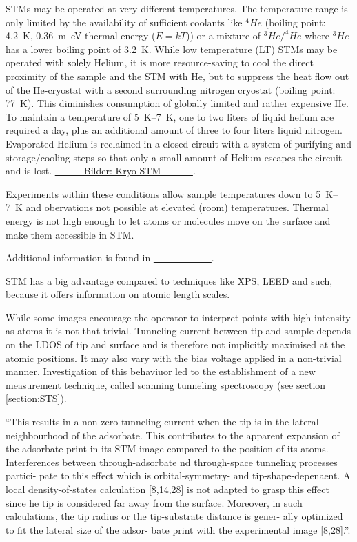 STMs may be operated at very different temperatures. The temperature range is only limited by the availability of sufficient coolants like $^4He$ (boiling point: \SI{4.2}{\K}, \SI{0.36}{\m\eV} thermal energy ($E=kT$)) or a mixture of $^3He/^4He$ where $^3He$ has a lower boiling point of \SI{3.2}{\K}. While low temperature (LT) STMs may be operated with solely Helium, it is more resource-saving to cool the direct proximity of the sample and the STM with He, but to suppress the heat flow out of the He-cryostat with a second surrounding nitrogen cryostat (boiling point: \SI{77}{\K}). This diminishes consumption of globally limited and rather expensive He. To maintain a temperature of \SIrange{5}{7}{\K}, one to two liters of liquid helium are required a day, plus an additional amount of three to four liters liquid nitrogen. Evaporated Helium is reclaimed in a closed circuit with a system of purifying and storage/cooling steps so that only a small amount of Helium escapes the circuit and is lost.
\underline{\ \ \ \ \ \ Bilder: Kryo STM \ \ \ \ \ \ }.

Experiments within these conditions allow sample temperatures down to \SIrange{5}{7}{\K} and obervations not possible at elevated (room) temperatures. Thermal energy is not high enough to let atoms or molecules move on the surface and make them accessible in STM.

Additional information is found in  \underline{\ \ \ \ \ \ \ \ \ \ \ \ }.

STM has a big advantage compared to techniques like XPS, LEED and such, because it offers information on atomic length scales.

While some images encourage the operator to interpret points with high intensity as atoms it is not that trivial. Tunneling current between tip and sample depends on the LDOS of tip and surface and is therefore not implicitly maximised at the atomic positions. It may also vary with the bias voltage applied in a non-trivial manner. Investigation of this behaviuor led to the establishment of a new measurement technique, called scanning tunneling spectroscopy (see section \ref{section:STS}). 

``This results in a non zero tunneling current when the tip is in the lateral neighbourhood of the adsorbate. This contributes to the apparent expansion of the adsorbate print in its STM image compared to the position of its atoms. Interferences between through-adsorbate nd through-space tunneling processes partici- pate to this effect which is orbital-symmetry- and tip-shape-depenaent. A local density-of-states calculation [8,14,28] is not adapted to grasp this effect since he tip is considered far away from the surface. Moreover, in such calculations, the tip radius or the tip-substrate distance is gener- ally optimized to fit the lateral size of the adsor- bate print with the experimental image [8,28].''\cite{sautet_interpretation_1992}.

